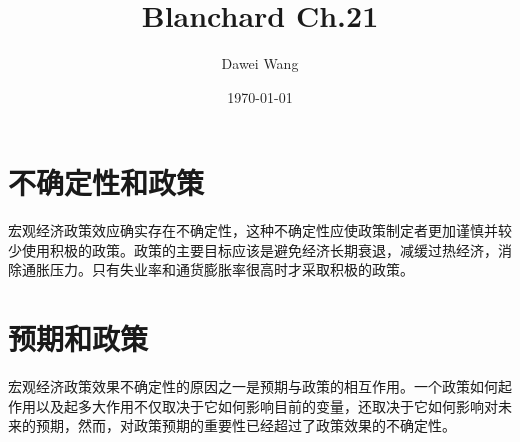 \documentclass{article}
\title{Blanchard Ch.21}
\author{Dawei Wang}
\date{\today}
\begin{document}
	\maketitle
\section{不确定性和政策}

宏观经济政策效应确实存在不确定性，这种不确定性应使政策制定者更加谨慎并较少使用积极的政策。政策的主要目标应该是避免经济长期衰退，减缓过热经济，消除通胀压力。只有失业率和通货膨胀率很高时才采取积极的政策。

\section{预期和政策}

宏观经济政策效果不确定性的原因之一是预期与政策的相互作用。一个政策如何起作用以及起多大作用不仅取决于它如何影响目前的变量，还取决于它如何影响对未来的预期，然而，对政策预期的重要性已经超过了政策效果的不确定性。






	
	
\end{document}
